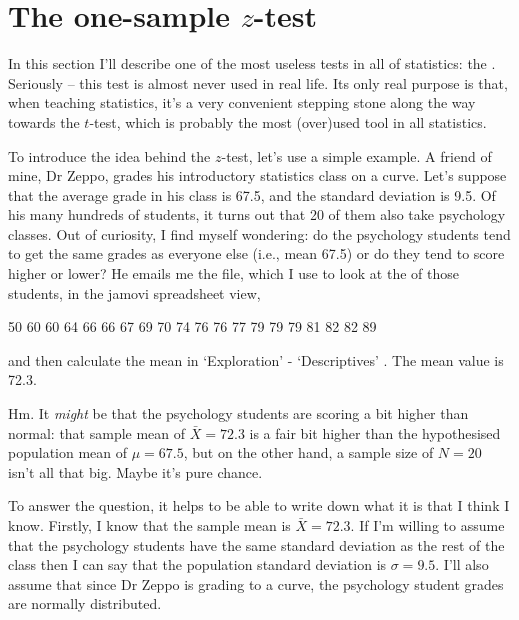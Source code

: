 \section{The one-sample $z$-test}

In this section I'll describe one of the most useless tests in all of statistics: the . Seriously -- this test is almost never used in real life. Its only real purpose is that, when teaching statistics, it's a very convenient stepping stone along the way towards the $t$-test, which is probably the most (over)used tool in all statistics.


To introduce the idea behind the $z$-test, let's use a simple example. A friend of mine, Dr Zeppo, grades his introductory statistics class on a curve. Let's suppose that the average grade in his class is 67.5, and the standard deviation is 9.5. Of his many hundreds of students, it turns out that 20 of them also take psychology classes. Out of curiosity, I find myself wondering: do the psychology students tend to get the same grades as everyone else (i.e., mean 67.5) or do they tend to score higher or lower? He emails me the  file, which I use to look at the  of those students, in the jamovi spreadsheet view, 

\begin{rblock1}
50 60 60 64 66 66 67 69 70 74 76 76 77 79 79 79 81 82 82 89
\end{rblock1} 

and then calculate the mean in `Exploration' - `Descriptives' . The mean value is 72.3.

Hm. It {\it might} be that the psychology students are scoring a bit higher than normal: that sample mean of $\bar{X} = 72.3$ is a fair bit higher than the hypothesised population mean of $\mu = 67.5$, but on the other hand, a sample size of $N = 20$ isn't all that big. Maybe it's pure chance. 

To answer the question, it helps to be able to write down what it is that I think I know. Firstly, I know that the sample mean is $\bar{X} = 72.3$. If I'm willing to assume that the psychology students have the same standard deviation as the rest of the class then I can say that the population standard deviation is $\sigma = 9.5$. I'll also assume that since Dr Zeppo is grading to a curve, the psychology student grades are normally distributed. 

